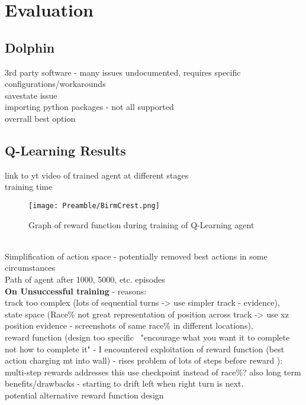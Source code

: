 
\chapter{Evaluation}

\section{Dolphin}
3rd party software - many issues undocumented, requires specific configurations/workarounds
\\ savestate issue
\\importing python packages - not all supported
\\overrall best option

\section{Q-Learning Results}
link to yt video of trained agent at different stages\\
training time \\
\begin{figure}
    \centering
    \texttt{[image: Preamble/BirmCrest.png]}
    \caption{Graph of reward function during training of Q-Learning agent}
    \label{fig:training-reward-q}
\end{figure}
\\Simplification of action space - potentially removed best actions in some circumstances
\\Path of agent after 1000, 5000, etc. episodes
\\ \textbf{On Unsuccessful training} - reasons: \\track too complex (lots of sequential turns -> use simpler track - evidence), \\state space (Race\% not great representation of position across track -> use xz position evidence - screenshots of same race\% in different locations), \\reward function (design too specific \cite{sutton2018reinforcement} ~"encourage what you want it to complete not how to complete it" - I encountered exploitation of reward function (best action charging mt into wall) - rises problem of lots of steps before reward \cite{mnih2013playing}): multi-step rewards addresses this use checkpoint instead of race\%? also long term benefits/drawbacks - starting to drift left when right turn is next.
\\potential alternative reward function design

